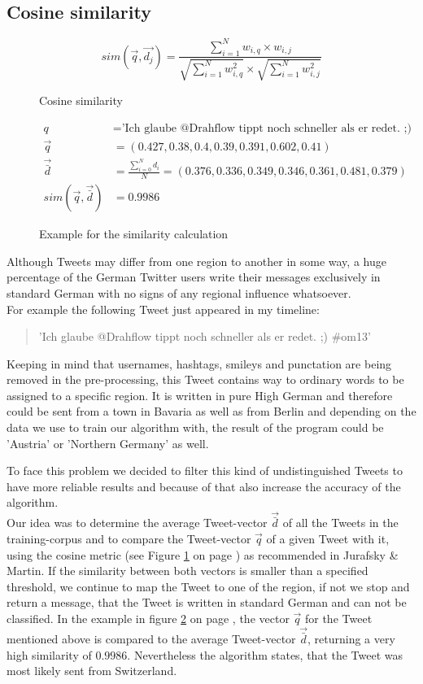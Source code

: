 \documentclass[../Main.tex]{subfiles}
\begin{document}
\subsection{Cosine similarity}
\begin{figure}
  \[ sim(\vec{q},\vec{d_j}) = \frac{\sum^N_{i=1} w_{i,q} \times w_{i,j}}{\sqrt{\sum^N_{i=1}w^2_{i,q}} \times \sqrt{\sum^N_{i=1}w^2_{i,j}}} \]
  \caption{Cosine similarity}
  \label{cos_sim}
\end{figure}
\begin{figure}
 \begin{align*}
  q &= \textrm{'Ich glaube @Drahflow tippt noch schneller als er redet. ;) \#om13' } \\
  \vec{q} &= (0.427, 0.38, 0.4, 0.39, 0.391, 0.602,  0.41) \\ 
   \vec{\bar{d}} &= \frac{\sum^N_{i=0} d_i}{N} =  (0.376, 0.336, 0.349, 0.346, 0.361, 0.481,  0.379) \\
  sim(\vec{q}, \vec{\bar{d}}) &= 0.9986 
\end{align*}
  \caption{Example for the similarity calculation}
  \label{cos_sim_example}
\end{figure}
Although Tweets may differ from one region to another in some way, a huge percentage of the German Twitter users write their messages exclusively in standard German with no signs of any regional influence whatsoever.  \\
For example the following Tweet just appeared in my timeline:
\begin{quote}
'Ich glaube @Drahflow tippt noch schneller als er redet. ;) \#om13'
\end{quote}
Keeping in mind that  usernames, hashtags, smileys and punctation are being removed in the pre-processing, this Tweet contains way to ordinary words to be assigned to a specific region. It is written in pure High German and therefore could be sent from a town in Bavaria as well as from Berlin and depending on the data we use to train our algorithm with, the result of the program could be 'Austria' or 'Northern Germany' as well.

To face this problem we decided to filter this kind of undistinguished Tweets to have more reliable results and because of that also increase the accuracy of the algorithm. \\
Our idea was to determine the average Tweet-vector $\vec{\bar{d}}$ of all the Tweets in the training-corpus and to compare the Tweet-vector $\vec{q}$ of a given Tweet with it, using the cosine metric (see Figure \ref{cos_sim} on page \pageref{cos_sim}) as recommended  in Jurafsky \& Martin. If the similarity between both vectors is smaller than a specified threshold, we continue to map the Tweet to one of the region, if not we stop and return a message, that the Tweet is written in standard German and can not be classified. In the example in figure \ref{cos_sim_example} on page \pageref{cos_sim_example}, the vector $\vec{q}$ for the Tweet mentioned above is compared to the average Tweet-vector $\vec{\bar{d}}$, returning a very high similarity of $0.9986$. Nevertheless the algorithm states, that the Tweet was most likely sent from Switzerland. 
\end{document}
